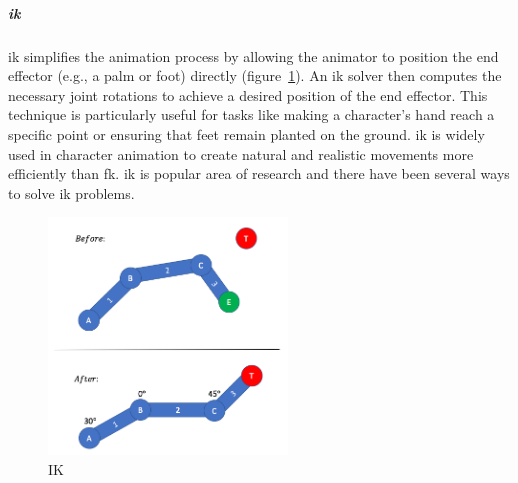 \documentclass[../../main.tex]{subfiles}
\begin{document}
\subparagraph{\gls{ik}}
\label{ch:background_work:sign_language_synthesis:3d_techniques:avatar_animation:kinematics:inverse_kinematics}

\gls{ik} simplifies the animation process by allowing the animator to position the end effector (e.g., a palm or foot) directly (figure~\ref{fig:inverse_kinematics_example}). An \gls{ik} solver then computes the necessary joint rotations to achieve a desired position of the end effector. This technique is particularly useful for tasks like making a character’s hand reach a specific point or ensuring that feet remain planted on the ground. \gls{ik} is widely used in character animation to create natural and realistic movements more efficiently than \gls{fk}. \gls{ik} is popular area of research and there have been several ways to solve \gls{ik} problems.

\begin{figure} 
  \centering \includegraphics[width = 2.5in]{chapters/background_work/images/inverse_kinematics_example.png} 
  \caption{IK} 
  \label{fig:inverse_kinematics_example} 
\end{figure}
\end{document}
